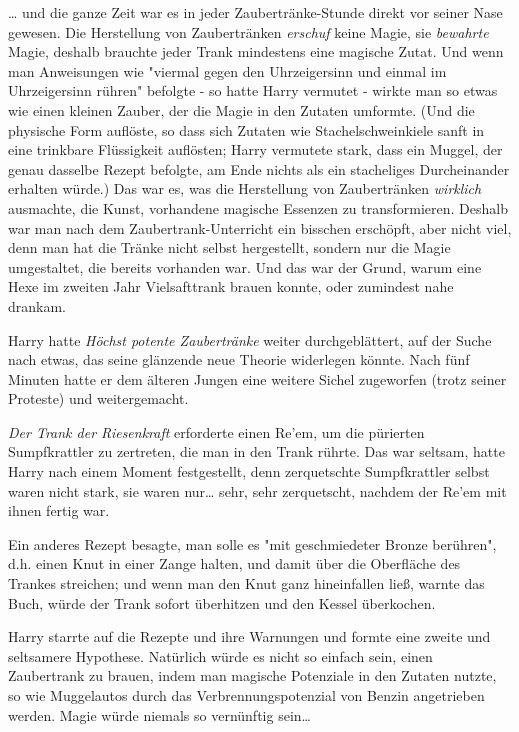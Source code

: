 {… und die ganze Zeit war es in jeder Zaubertränke-Stunde direkt vor seiner Nase gewesen. Die Herstellung von Zaubertränken \emph{erschuf} keine Magie, sie \emph{bewahrte} Magie, deshalb brauchte jeder Trank mindestens eine magische Zutat. Und wenn man Anweisungen wie "viermal gegen den Uhrzeigersinn und einmal im Uhrzeigersinn rühren" befolgte - so hatte Harry vermutet - wirkte man so etwas wie einen kleinen Zauber, der die Magie in den Zutaten umformte. (Und die physische Form auflöste, so dass sich Zutaten wie Stachelschweinkiele sanft in eine trinkbare Flüssigkeit auflösten; Harry vermutete stark, dass ein Muggel, der genau dasselbe Rezept befolgte, am Ende nichts als ein stacheliges Durcheinander erhalten würde.) Das war es, was die Herstellung von Zaubertränken \emph{wirklich} ausmachte, die Kunst, vorhandene magische Essenzen zu transformieren. Deshalb war man nach dem Zaubertrank-Unterricht ein bisschen erschöpft, aber nicht viel, denn man hat die Tränke nicht selbst hergestellt, sondern nur die Magie umgestaltet, die bereits vorhanden war. Und das war der Grund, warum eine Hexe im zweiten Jahr Vielsafttrank brauen konnte, oder zumindest nahe drankam.

Harry hatte \emph{Höchst potente Zaubertränke} weiter durchgeblättert, auf der Suche nach etwas, das seine glänzende neue Theorie widerlegen könnte. Nach fünf Minuten hatte er dem älteren Jungen eine weitere Sichel zugeworfen (trotz seiner Proteste) und weitergemacht.

\emph{Der Trank der Riesenkraft} erforderte einen Re'em, um die pürierten Sumpfkrattler zu zertreten, die man in den Trank rührte. Das war seltsam, hatte Harry nach einem Moment festgestellt, denn zerquetschte Sumpfkrattler selbst waren nicht stark, sie waren nur… sehr, sehr zerquetscht, nachdem der Re'em mit ihnen fertig war.

Ein anderes Rezept besagte, man solle es "mit geschmiedeter Bronze berühren", d.h. einen Knut in einer Zange halten, und damit über die Oberfläche des Trankes streichen; und wenn man den Knut ganz hineinfallen ließ, warnte das Buch, würde der Trank sofort überhitzen und den Kessel überkochen.

Harry starrte auf die Rezepte und ihre Warnungen und formte eine zweite und seltsamere Hypothese. Natürlich würde es nicht so einfach sein, einen Zaubertrank zu brauen, indem man magische Potenziale in den Zutaten nutzte, so wie Muggelautos durch das Verbrennungspotenzial von Benzin angetrieben werden. Magie würde niemals so vernünftig sein…

}
